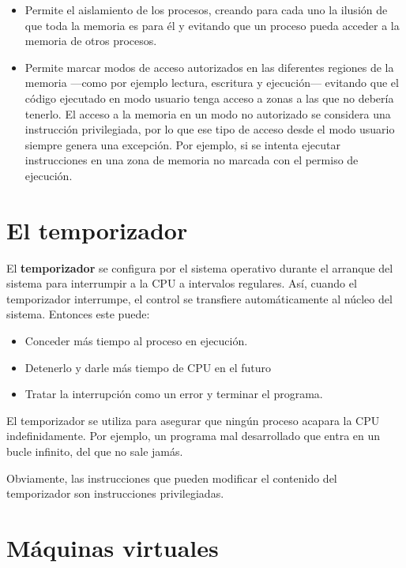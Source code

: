 \begin{itemize}
\item
  Permite el aislamiento de los procesos, creando para cada uno la
  ilusión de que toda la memoria es para él y evitando que un proceso
  pueda acceder a la memoria de otros procesos.
\item
  Permite marcar modos de acceso autorizados en las diferentes regiones
  de la memoria ---como por ejemplo lectura, escritura y ejecución---
  evitando que el código ejecutado en modo usuario tenga acceso a zonas
  a las que no debería tenerlo. El acceso a la memoria en un modo no
  autorizado se considera una instrucción privilegiada, por lo que ese
  tipo de acceso desde el modo usuario siempre genera una excepción. Por
  ejemplo, si se intenta ejecutar instrucciones en una zona de memoria
  no marcada con el permiso de ejecución.
\end{itemize}

\section{El temporizador}\label{_el_temporizador}

El \textbf{{}temporizador} se configura por el sistema operativo durante
el arranque del sistema para interrumpir a la CPU a intervalos
regulares. Así, cuando el temporizador interrumpe, el control se
transfiere automáticamente al núcleo del sistema. Entonces este puede:

\begin{itemize}
\item
  Conceder más tiempo al proceso en ejecución.
\item
  Detenerlo y darle más tiempo de CPU en el futuro
\item
  Tratar la interrupción como un error y terminar el programa.
\end{itemize}

El temporizador se utiliza para asegurar que ningún proceso acapara la
CPU indefinidamente. Por ejemplo, un programa mal desarrollado que entra
en un bucle infinito, del que no sale jamás.

Obviamente, las instrucciones que pueden modificar el contenido del
temporizador son instrucciones privilegiadas.

\section{Máquinas virtuales}\label{_muxe1quinas_virtuales}

